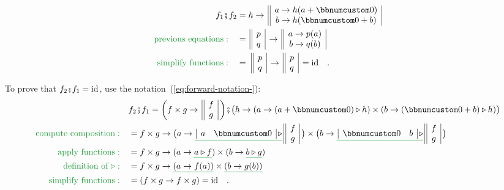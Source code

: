 \begin{align*}
f_{1}\bef f_{2} & =h\rightarrow\,\begin{array}{||c|}
a\rightarrow h(a+\bbnum 0)\\
b\rightarrow h(\bbnum 0+b)
\end{array}\\
{\color{greenunder}\text{previous equations}:}\quad & =\,\begin{array}{||c|}
p\\
q
\end{array}\,\rightarrow\,\begin{array}{||c|}
a\rightarrow p(a)\\
b\rightarrow q(b)
\end{array}\\
{\color{greenunder}\text{simplify functions}:}\quad & =\,\,\begin{array}{||c|}
p\\
q
\end{array}\,\rightarrow\,\begin{array}{||c|}
p\\
q
\end{array}\,=\text{id}\quad.
\end{align*}

To prove that $f_{2}\bef f_{1}=\text{id}$, use the notation~(\ref{eq:forward-notation-}):
\begin{align*}
 & f_{2}\bef f_{1}=\bigg(f\times g\rightarrow\,\begin{array}{||c|}
f\\
g
\end{array}\,\bigg)\bef\big(h\rightarrow(a\rightarrow(a+\bbnum 0)\triangleright h)\times(b\rightarrow(\bbnum 0+b)\triangleright h)\big)\\
{\color{greenunder}\text{compute composition}:}\quad & =f\times g\rightarrow\big(a\rightarrow\gunderline{\,\begin{array}{|cc|}
a & \bbnum 0\end{array}\,\triangleright}\,\begin{array}{||c|}
f\\
g
\end{array}\,\big)\times\big(b\rightarrow\gunderline{\,\begin{array}{|cc|}
\bbnum 0 & b\end{array}\,\triangleright}\,\begin{array}{||c|}
f\\
g
\end{array}\,\big)\\
{\color{greenunder}\text{apply functions}:}\quad & =f\times g\rightarrow(a\rightarrow\gunderline{a\triangleright f})\times(b\rightarrow\gunderline{b\triangleright g})\\
{\color{greenunder}\text{definition of }\triangleright:}\quad & =f\times g\rightarrow\gunderline{\left(a\rightarrow f(a)\right)}\times\gunderline{\left(b\rightarrow g(b)\right)}\\
{\color{greenunder}\text{simplify functions}:}\quad & =\left(f\times g\rightarrow f\times g\right)=\text{id}\quad.
\end{align*}

